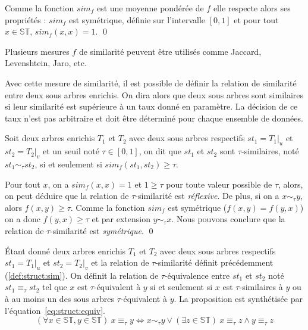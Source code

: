 \begin{proposition}
    Comme la fonction $sim_f$ est une moyenne pondérée de $f$ elle respecte alors ses propriétés :
    $sim_f$ est symétrique, définie sur l'intervalle $[0, 1]$ et pour tout $x \in \mathbb{ST}$, $sim_f(x, x) = 1$.
    \qed
\end{proposition}

Plusieurs mesures $f$ de similarité peuvent être utilisés comme Jaccard, Levenshtein, Jaro, etc.

\begin{example}
\end{example}

Avec cette mesure de similarité, il est possible de définir la relation de similarité entre deux sous arbres enrichis.
On dira alors que deux sous arbres sont similaires si leur similarité est supérieure à un taux donné en paramètre.
La décision de ce taux n'est pas arbitraire et doit être déterminé pour chaque ensemble de données.

\begin{definition}
    \label{def:struct:sim}
    Soit deux arbres enrichis $T_1$ et $T_2$ avec deux sous arbres respectifs $st_1 = T_1|_u$ et $st_2 = T_2|_v$ et un seuil noté $\tau \in [0, 1]$, on dit que $st_1$ et $st_2$ sont $\tau$-similaires, noté $st_1 \sim_\tau st_2$, si et seulement si $sim_f(st_1, st_2) \geq \tau$.
\end{definition}

\begin{proposition}
    Pour tout $x$, on a $sim_f(x, x) = 1$ et $1 \ge \tau$ pour toute valeur possible de $\tau$, alors, on peut déduire que la relation de $\tau$-similarité est \emph{réflexive}.
    De plus, si on a $x \sim_\tau y$, alors $f(x, y) \ge \tau$.
    Comme la fonction $sim_f$ est symétrique ($f(x, y) = f(y, x)$) on a donc $f(y, x) \ge \tau$ et par extension $y \sim_\tau x$.
    Nous pouvons conclure que la relation de $\tau$-similarité est \emph{symétrique}.
    \qed
\end{proposition}

\begin{definition}
    \label{def:struct:equiv}
    Étant donné deux arbres enrichis $T_1$ et $T_2$ avec deux sous arbres respectifs $st_1 = T_1|_u$ et $st_2 = T_2|_v$ et la relation de $\tau$-similarité définit précédemment (\ref{def:struct:sim}).
    On définit la relation de $\tau$-équivalence entre $st_1$ et $st_2$ noté $st_1 \equiv_\tau st_2$ tel que $x$ est $\tau$-équivalent à $y$ si et seulement si $x$ est $\tau$-similaires à $y$ ou à au moins un des sous arbres $\tau$-équivalent à $y$.
    La proposition est synthétisée par l'équation~\ref{eq:struct:equiv}.
    \begin{equation}
        (\forall x \in \mathbb{ST}, y \in \mathbb{ST}) ~ x \equiv_\tau y \iff x \sim_\tau y \lor (\exists z \in \mathbb{ST}) ~ x \equiv_\tau z \land y \equiv_\tau z \label{eq:struct:equiv}
    \end{equation}
\end{definition}

